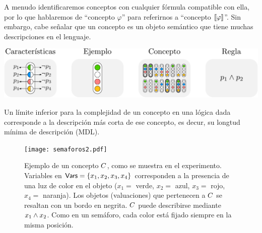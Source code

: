 
A menudo identificaremos conceptos con cualquier fórmula compatible con ella, por lo que hablaremos de ``concepto $\varphi$'' para referirnos a ``concepto $\llbracket \varphi\rrbracket$''. Sin embargo, cabe señalar que un concepto es un objeto semántico que tiene muchas descripciones en el lenguaje.

\includegraphics[scale=.6]{../figuras/pre/notacion.pdf}

Un límite inferior para la complejidad de un concepto en una lógica dada corresponde a la descripción más corta de ese concepto, es decur, su longtud mínima de descripción (MDL).

 \begin{figure}[t!]
 \vspace{-0.5cm}
  \centering
  \texttt{[image: semaforos2.pdf]}
  \caption{Ejemplo de un concepto $C$, como se muestra en el experimento. Variables en ${\sf Vars}=\{x_1,x_2,x_3,x_4\}$ corresponden a la presencia de una luz de color en el objeto ($x_{1}=$ verde, $x_2=$ azul, $x_3=$ rojo, $x_4=$ naranja). Los objetos (valuaciones) que pertenecen a $C$ se resaltan con un bordo en negrita. $C$ puede describirse mediante $x_1\wedge x_2$. Como en un semáforo, cada color está fijado siempre en la misma posición.}
  \label{semaforos}
\end{figure}
   
